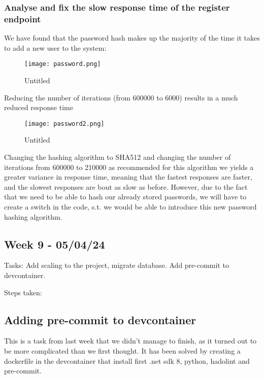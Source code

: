 \subsubsection{Analyse and fix the slow response time of the register endpoint}
\label{log:analyse-and-fix-the-slow-response-time-of-the-register-endpoint}

We have found that the password hash makes up the majority of the time it takes to add a new user to the system:

\begin{figure}
\centering
\texttt{[image: password.png]}
\caption{Untitled}
\end{figure}

Reducing the number of iterations (from 600000 to 6000) results in a much reduced response time

\begin{figure}
\centering
\texttt{[image: password2.png]}
\caption{Untitled}
\end{figure}

Changing the hashing algorithm to SHA512 and changing the number of iterations from 600000 to 210000 as recommended for this algorithm we yields a greater variance in response time, meaning that the fastest responses are faster, and the slowest responses are bout as slow as before. However, due to the fact that we need to be able to hash our already stored passwords, we will have to create a switch in the code, s.t. we would be able to introduce this new password hashing algorithm.

\subsection{Week 9 - 05/04/24}
\label{log:week9}

Tasks: Add scaling to the project, migrate database. Add pre-commit to
devcontainer.

Steps taken:

\subsection{Adding pre-commit to devcontainer}
\label{log:adding-pre-commit-to-devcontainer}

This is a task from last week that we didn't manage to finish, as it turned out to be more complicated than we first thought. It has been solved by creating a dockerfile in the devcontainer that install first .net sdk 8, python, hadolint and pre-commit.


